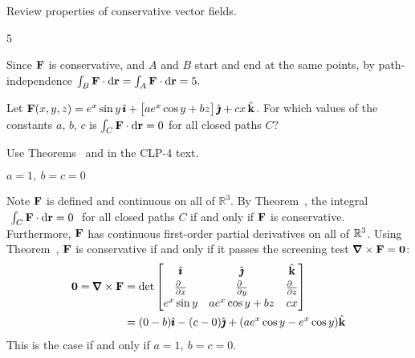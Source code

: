 \begin{hint}
Review properties of conservative vector fields.
\end{hint}
\begin{answer}
5
\end{answer}
\begin{solution}
Since $\mathbf{F}$ is conservative, and $A$ and $B$ start and end at the same points, by path-independence 
$\int_B \mathbf{F}\cdot\mathrm{d}\mathbf{r}=\int_A \mathbf{F}\cdot\mathrm{d}\mathbf{r}=5.$
\end{solution}

\begin{question}[M317 2016D] %
Let $\mathbf{F}(x, y, z) = e^x \sin y\,\hat{\pmb{\imath}} + \big[ ae^x \cos y + bz\big]\,\hat{\pmb{\jmath}} 
   + cx\, \hat{\mathbf{k}}$. For which values of the constants $a$, $b$, $c$
is $\int_C\mathbf{F}\cdot\mathrm{d}\mathbf{r}=0$ for all closed paths $C$?
\end{question}

\begin{hint} 
Use Theorems~ and  in the CLP-4 text.
\end{hint}

\begin{answer} 
$a=1,\ b=c=0$
\end{answer}

\begin{solution} 
Note $\mathbf{F}$ is defined and continuous on all of $\mathbb R^3$. By  Theorem~, the integral $\ \int_C\mathbf{F}\cdot \mathrm{d}\mathbf{r}=0\ $ for all closed paths $C$
if and only if $\mathbf{F}$ is conservative. Furthermore, $\mathbf{F}$ has continuous first-order partial derivatives on all of $\mathbb{R}^3$. Using Theorem~, $\mathbf{F}$ is conservative if
and only if it passes the screening test $\vnabla\times\vF=\vZero$:
\begin{align*}
\vZero=\vnabla\times\vF
&=\det\left[\begin{matrix}\hi&\hj&\hk\\[0.03in] 
            \frac{\partial\hfill}{\partial x}&
            \frac{\partial\hfill}{\partial y}&
            \frac{\partial\hfill}{\partial z}\\[0.03in]
  e^x\sin y & ae^x\cos y+bz & cx\end{matrix}\right] \\
&=(0-b)\hi-(c-0)\hj+(ae^x\cos y-e^x\cos y)\hk
\end{align*}
This is the case if and only if $a=1,\ b=c=0$.
\end{solution}

